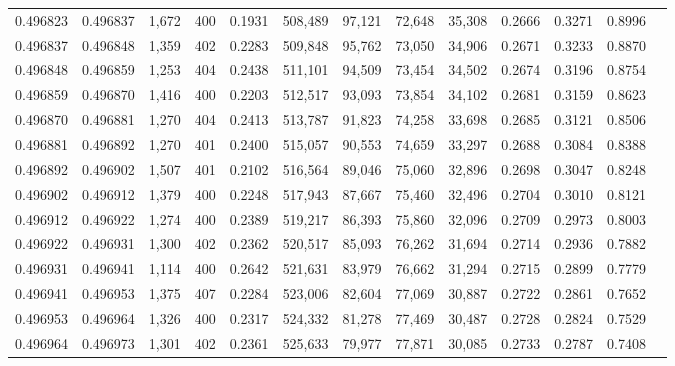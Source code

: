\begin{tabular}{rrrrrrrrrrrrr}
0.496823 & 0.496837 & 1,672 & 400 &                                     0.1931 & 508,489 &  97,121 &  72,648 &  35,308 & 0.2666 & 0.3271 & 0.8996 \\
0.496837 & 0.496848 & 1,359 & 402 &                                     0.2283 & 509,848 &  95,762 &  73,050 &  34,906 & 0.2671 & 0.3233 & 0.8870 \\
0.496848 & 0.496859 & 1,253 & 404 &                                     0.2438 & 511,101 &  94,509 &  73,454 &  34,502 & 0.2674 & 0.3196 & 0.8754 \\
0.496859 & 0.496870 & 1,416 & 400 &                                     0.2203 & 512,517 &  93,093 &  73,854 &  34,102 & 0.2681 & 0.3159 & 0.8623 \\
0.496870 & 0.496881 & 1,270 & 404 &                                     0.2413 & 513,787 &  91,823 &  74,258 &  33,698 & 0.2685 & 0.3121 & 0.8506 \\
0.496881 & 0.496892 & 1,270 & 401 &                                     0.2400 & 515,057 &  90,553 &  74,659 &  33,297 & 0.2688 & 0.3084 & 0.8388 \\
0.496892 & 0.496902 & 1,507 & 401 &                                     0.2102 & 516,564 &  89,046 &  75,060 &  32,896 & 0.2698 & 0.3047 & 0.8248 \\
0.496902 & 0.496912 & 1,379 & 400 &                                     0.2248 & 517,943 &  87,667 &  75,460 &  32,496 & 0.2704 & 0.3010 & 0.8121 \\
0.496912 & 0.496922 & 1,274 & 400 &                                     0.2389 & 519,217 &  86,393 &  75,860 &  32,096 & 0.2709 & 0.2973 & 0.8003 \\
0.496922 & 0.496931 & 1,300 & 402 &                                     0.2362 & 520,517 &  85,093 &  76,262 &  31,694 & 0.2714 & 0.2936 & 0.7882 \\
0.496931 & 0.496941 & 1,114 & 400 &                                     0.2642 & 521,631 &  83,979 &  76,662 &  31,294 & 0.2715 & 0.2899 & 0.7779 \\
0.496941 & 0.496953 & 1,375 & 407 &                                     0.2284 & 523,006 &  82,604 &  77,069 &  30,887 & 0.2722 & 0.2861 & 0.7652 \\
0.496953 & 0.496964 & 1,326 & 400 &                                     0.2317 & 524,332 &  81,278 &  77,469 &  30,487 & 0.2728 & 0.2824 & 0.7529 \\
0.496964 & 0.496973 & 1,301 & 402 &                                     0.2361 & 525,633 &  79,977 &  77,871 &  30,085 & 0.2733 & 0.2787 & 0.7408 \\

\end{tabular}
